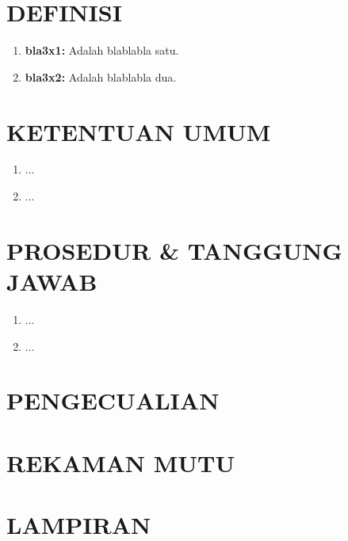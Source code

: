 \documentclass[12pt]{soi_v2}
\begin{document}
    \section{DEFINISI}
    \begin{enumerate}
        \item \textbf{bla3x1:} Adalah blablabla satu.
        \item \textbf{bla3x2:} Adalah blablabla dua.
    \end{enumerate}

    \section{KETENTUAN UMUM}
    \begin{enumerate}
        \item ...
        \item ...
    \end{enumerate}

    \section{PROSEDUR \& TANGGUNG JAWAB}
    \begin{enumerate}
        \item ...
        \item ...
    \end{enumerate}

    \section{PENGECUALIAN}
    \section{REKAMAN MUTU}
    \section{LAMPIRAN}
\end{document}
